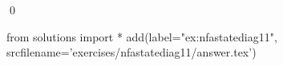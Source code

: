 
\begin{ex} 
  \label{ex:nfastatediag11}
  
  \qed
\end{ex} 
\begin{python0}
from solutions import *
add(label="ex:nfastatediag11",
    srcfilename='exercises/nfastatediag11/answer.tex') 
\end{python0}
